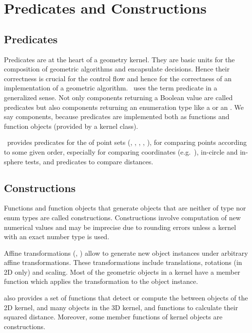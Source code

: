 \section{Predicates and Constructions}

\subsection{Predicates}
Predicates are at the heart of a geometry kernel. They are basic units
for the composition of geometric algorithms and encapsulate decisions. 
Hence their correctness is crucial for the control flow and hence for
the correctness of an implementation of a geometric algorithm. \cgal\ uses
the term predicate in a generalized sense. Not only components returning a
Boolean value are called predicates but also components returning an 
enumeration type like a  or an .
We say components, because predicates are implemented both as functions and 
function objects (provided by a kernel class).

\cgal\ provides predicates for the  of point 
sets (, , , ,
), for comparing points according to some given order, 
especially for comparing  coordinates
(e.g.~), in-circle and in-sphere tests,
and predicates to compare distances.

\subsection{Constructions}
Functions and function objects that generate objects that are neither 
of type  nor enum types are called constructions.
Constructions involve computation of new numerical values and may be
imprecise due to rounding errors unless a kernel with an exact number type is 
used.

Affine transformations (, 
) allow to generate new object instances under
arbitrary affine transformations. These transformations include translations,
rotations (in 2D only) and scaling. Most of the geometric objects in a
kernel have a member function  
which applies the transformation to the object instance.

{\cgal} also provides a set of functions that detect or compute the 
between objects of the 2D kernel, and many objects in the 3D kernel,
and functions to calculate their 
squared distance.
Moreover, some member functions of kernel objects are constructions. 

